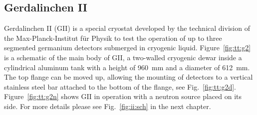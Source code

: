 \subsection{Gerdalinchen II}
\label{sec:tt:gii}
Gerdalinchen II (GII) is a special cryostat developed by the technical division of the Max-Planck-Institut f\"ur Physik to test the operation of up to three segmented germanium detectors submerged in cryogenic liquid. Figure~\ref{fig:tt:g2} is a schematic of the main body of GII, a two-walled cryogenic dewar inside a cylindrical aluminum tank with a height of 960~mm and a diameter of 612~mm. The top flange can be moved up, allowing the mounting of detectors to a vertical stainless steel bar attached to the bottom of the flange, see Fig.~\ref{fig:tt:g2d}. Figure~\ref{fig:tt:g2n} shows GII in operation with a neutron source placed on its side. For more details please see Fig.~\ref{fig:ii:sch} in the next chapter.

